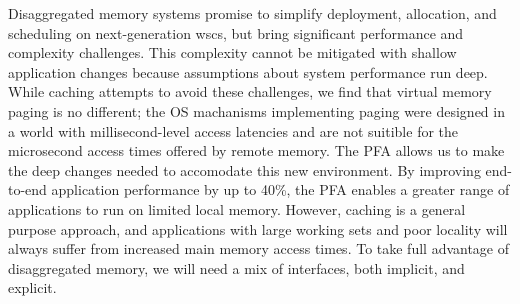 Disaggregated memory systems promise to simplify deployment, allocation, and
scheduling on next-generation \glspl{wsc}, but bring significant performance
and complexity challenges. This complexity cannot be mitigated with shallow
application changes because assumptions about system performance run deep.
While caching attempts to avoid these challenges, we find that virtual memory
paging is no different; the OS machanisms implementing paging were designed in
a world with millisecond-level access latencies and are not suitible for the
microsecond access times offered by remote memory. The PFA allows us to make
the deep changes needed to accomodate this new environment. By improving
end-to-end application performance by up to 40\%, the PFA enables a greater
range of applications to run on limited local memory. However, caching is a
general purpose approach, and applications with large working sets and poor
locality will always suffer from increased main memory access times. To take
full advantage of disaggregated memory, we will need a mix of interfaces, both
implicit, and explicit.

